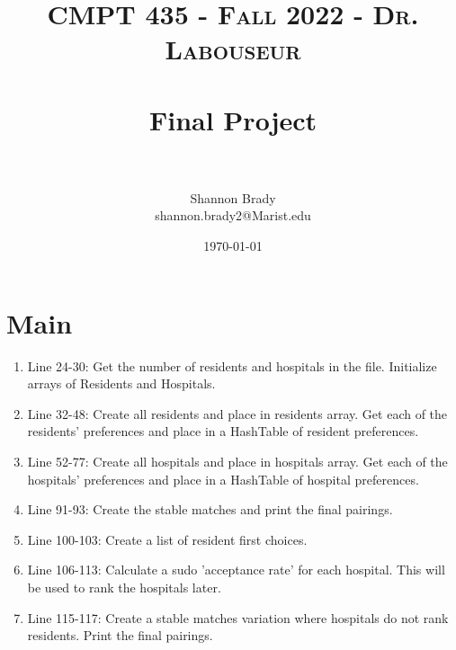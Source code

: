\documentclass[letterpaper, 10pt,DIV=13]{scrartcl}
\title{	
   \normalfont \normalsize 
   \textsc{CMPT 435 - Fall 2022 - Dr. Labouseur} \\[10pt] %
   \horrule{0.5pt} \\[0.25cm] 	     %
   \huge Final Project  \\     	 %
   \horrule{0.5pt} \\[0.25cm] 	     %
}
\author{Shannon Brady \\ \normalsize shannon.brady2@Marist.edu}
\date{\normalsize\today} 	%
\numberwithin{equation}{section} %
\numberwithin{figure}{section} %
\numberwithin{table}{section} %
\begin{document}
\maketitle %

\section{Main}
\begin{enumerate}
    \item Line 24-30: Get the number of residents and hospitals in the file. Initialize arrays of Residents and Hospitals.
    \item Line 32-48: Create all residents and place in residents array. Get each of the residents' preferences and place in a HashTable of resident preferences. 
    \item Line 52-77: Create all hospitals and place in hospitals array. Get each of the hospitals' preferences and place in a HashTable of hospital preferences. 
    \item Line 91-93: Create the stable matches and print the final pairings.
    \item Line 100-103: Create a list of resident first choices.
    \item Line 106-113: Calculate a sudo 'acceptance rate' for each hospital. This will be used to rank the hospitals later.
    \item Line 115-117: Create a stable matches variation where hospitals do not rank residents. Print the final pairings.
\end{enumerate}
\end{document}
